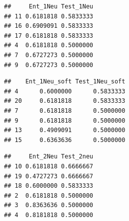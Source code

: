 \documentclass[]{article}
\newenvironment{Shaded}{\begin{snugshade}}{\end{snugshade}}
\newcommand{\KeywordTok}[1]{\textcolor[rgb]{0.13,0.29,0.53}{\textbf{#1}}}
\newcommand{\DataTypeTok}[1]{\textcolor[rgb]{0.13,0.29,0.53}{#1}}
\newcommand{\DecValTok}[1]{\textcolor[rgb]{0.00,0.00,0.81}{#1}}
\newcommand{\OperatorTok}[1]{\textcolor[rgb]{0.81,0.36,0.00}{\textbf{#1}}}
\newcommand{\NormalTok}[1]{#1}
\begin{document}
\begin{verbatim}
##     Ent_1Neu Test_1Neu
## 11 0.6181818 0.5833333
## 16 0.6909091 0.5833333
## 17 0.6181818 0.5833333
## 4  0.6181818 0.5000000
## 7  0.6727273 0.5000000
## 9  0.6727273 0.5000000
\end{verbatim}

\begin{Shaded}
\end{Shaded}

\begin{verbatim}
##    Ent_1Neu_soft Test_1Neu_soft
## 4      0.6000000      0.5833333
## 20     0.6181818      0.5833333
## 7      0.6181818      0.5000000
## 9      0.6181818      0.5000000
## 13     0.4909091      0.5000000
## 15     0.6363636      0.5000000
\end{verbatim}

\begin{Shaded}
\end{Shaded}

\begin{verbatim}
##     Ent_2Neu Test_2neu
## 10 0.6181818 0.6666667
## 19 0.4727273 0.6666667
## 18 0.6000000 0.5833333
## 2  0.6181818 0.5000000
## 3  0.8363636 0.5000000
## 4  0.8181818 0.5000000
\end{verbatim}

\begin{Shaded}
\end{Shaded}
\end{document}
